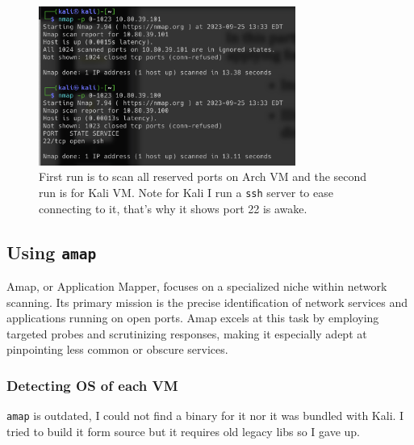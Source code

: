 \documentclass{article}
\def\c#1{\texttt{#1}}
\begin{document}
\begin{figure}[ht]
	\begin{center}
		\includegraphics[width=0.75\textwidth]{figures/nmap-scan.png}
	\end{center}
	\caption{First run is to scan all reserved ports on Arch VM and the second run is for Kali VM. Note for Kali I run a \c{ssh} server to ease connecting to it, that's why it shows port 22 is awake.}\label{fig:nmap-scan}
\end{figure}


\subsection{Using \c{amap}}
Amap, or Application Mapper, focuses on a specialized niche within network scanning. Its primary mission is the precise identification of network services and applications running on open ports. Amap excels at this task by employing targeted probes and scrutinizing responses, making it especially adept at pinpointing less common or obscure services.

\subsubsection{Detecting OS of each VM}
\c{amap} is outdated, I could not find a binary for it nor it was bundled with Kali. I tried to build it form source but it requires old legacy libs so I gave up.
\end{document}
